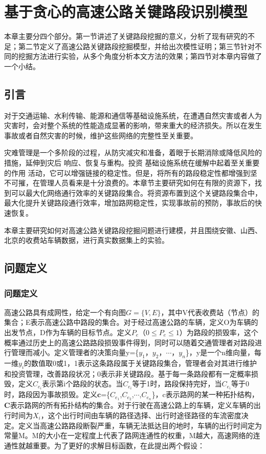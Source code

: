 
\chapter{基于贪心的高速公路关键路段识别模型}
		本章主要分四个部分。第一节讲述了关键路段挖掘的意义，分析了现有研究的不足；第二节定义了高速公路关键路段挖掘模型，并给出次模性证明；第三节针对不同的挖掘方法进行实验，从多个角度分析本文方法的效果；第四节对本章内容做了一个小结。
		\section{引言}
		对于交通运输\parencite{NewmanBasic}、水利传输\parencite{test}、能源和通信等基础设施系统，在遭遇自然灾害或者人为灾害时，会对整个系统的性能造成显著的影响，带来重大的经济损失。所以在发生事故或者自然灾害的时候，维护这些网络的完整性至关重要。

		灾难管理是一个多阶段的过程，从防灾减灾和准备，着眼于长期消除或降低风险的措施，延伸到灾后 响应、恢复与重构。投资 基础设施系统在缓解中起着至关重要的作用 活动，它可以增强链接的稳定性。但是，将所有的路段稳定性都增强到坚不可摧，在管理人员看来是十分浪费的。本章节主要研究如何在有限的资源下，找到可以最大化网络通行效率的关键路段集合。将资源布置到这个关键路段集合中，最大化提升关键路段通行效率，增加路网稳定性，实现事故前的预防，事故后的快速恢复。

		本章主要研究如何对高速公路关键路段挖掘问题进行建模，并且围绕安徽、山西、北京的收费站车辆数据，进行真实数据集上的实验。

		\section{问题定义}
			\subsection{问题定义}
			高速公路具有成网性，给定一个有向图$G=\{V,E\}$，其中V代表收费站（节点）的集合；E表示高速公路中路段的集合。对于经过高速公路的车辆，定义O为车辆的出发节点，D作为车辆的目标节点。定义$P_e$（$0\leqslant P_e\leqslant 1$）为路段的损毁率，这个概率通过历史上的高速公路路段损毁事件得到，同时可以随着交通管理者对路段进行管理而减小。定义管理者的决策向量y=\{$y_1$，$y_2$，$\cdots$，$y_n$\}，y是一个n维向量，每一维$y_i$的数值取0或1，1表示这条路段属于关键路段集合，管理者会对其进行维护和投资管理，改善路段状况；0表示非关键路段。基于每一条路段都有一定概率损毁，定义$C_{e_i}$表示第i个路段的状态。当$C_{e_i}$等于1时，路段保持完好，当$C_{e_i}$等于0时，路段因为事故损毁。定义$\bm{c}$=\{$C_{e_1}$,$C_{e_2}$,$\cdots$,$C_{e_n}$\}，c表示路网的某一种拓扑结构，$\bm{C}$表示路网的所有拓扑结构的集合。对于行驶在高速公路上的车辆，定义车辆的出行时间为$X_i$，这个出行时间由车辆的路径选择、出行时途径路径的车流密度决定。定义当高速公路路段断裂严重，车辆无法抵达目的地时，车辆的出行时间定为常量M。M的大小在一定程度上代表了路网连通性的权重，M越大，高速网络的连通性就越重要。为了更好的求解目标函数，在此提出两个假设：

